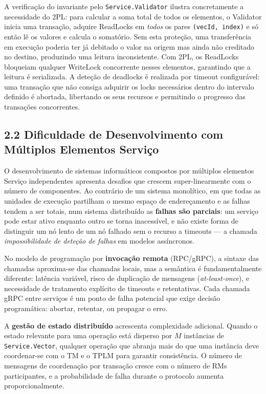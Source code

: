 A verificação do invariante pelo \texttt{Service.Validator} ilustra concretamente a necessidade do
2PL: para calcular a soma total de todos os elementos, o Validator inicia uma transação, adquire
ReadLocks em \emph{todos} os pares \texttt{(vecId, index)} e só então lê os valores e calcula
o somatório. Sem esta proteção, uma transferência em execução poderia ter já debitado o valor na
origem mas ainda não creditado no destino, produzindo uma leitura inconsistente. Com 2PL, os
ReadLocks bloqueiam qualquer WriteLock concorrente nesses elementos, garantindo que a leitura é
serializada. A deteção de deadlocks é realizada por timeout configurável: uma transação que não
consiga adquirir os locks necessários dentro do intervalo definido é abortada, libertando os seus
recursos e permitindo o progresso das transações concorrentes.

\subsection*{2.2 Dificuldade de Desenvolvimento com Múltiplos Elementos Serviço}

O desenvolvimento de sistemas informáticos compostos por múltiplos elementos Serviço independentes
apresenta desafios que crescem super-linearmente com o número de componentes. Ao contrário de
um sistema monolítico, em que todas as unidades de execução partilham o mesmo espaço de
endereçamento e as falhas tendem a ser totais, num sistema distribuído as \textbf{falhas são
parciais}: um serviço pode estar ativo enquanto outro se torna inacessível, e não existe forma de
distinguir um nó lento de um nó falhado sem o recurso a timeouts — a chamada
\textit{impossibilidade de deteção de falhas} em modelos assíncronos.

No modelo de programação por \textbf{invocação remota} (RPC/gRPC), a sintaxe das chamadas
aproxima-se das chamadas locais, mas a semântica é fundamentalmente diferente: latência variável,
risco de duplicação de mensagens (\textit{at-least-once}), e necessidade de tratamento explícito
de timeouts e retentativas. Cada chamada gRPC entre serviços é um ponto de falha potencial que
exige decisão programática: abortar, retentar, ou propagar o erro.

A \textbf{gestão de estado distribuído} acrescenta complexidade adicional. Quando o estado
relevante para uma operação está disperso por $M$ instâncias de \texttt{Service.Vector}, qualquer
operação que abranja mais do que uma instância deve coordenar-se com o TM e o TPLM para garantir
consistência. O número de mensagens de coordenação por transação cresce com o número de RMs
participantes, e a probabilidade de falha durante o protocolo aumenta proporcionalmente.

